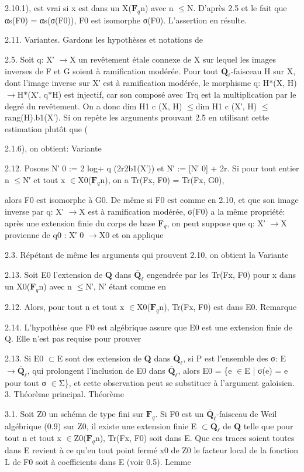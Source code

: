 \documentclass[11pt]{article}
\begin{document}
2.10.1), est vrai si x est dans un X(\(\mathbf F_q\)n) avec n \(\le\)N. D’après 2.5 et le fait que αs(F0) = αs(σ(F0)), F0 est isomorphe σ(F0). L’assertion en résulte. 

2.11. Variantes. Gardons les hypothèses et notations de 

2.5. Soit q: X′ \(\to\)X un revêtement étale connexe de X sur lequel les images inverses de F et G soient à ramification modérée. Pour tout \(\overline{\mathbf Q}_\ell\)-faisceau H sur X, dont l’image inverse sur X′ est à ramification modérée, le morphisme q: H\(*\)(X, H) \(\to\)H\(*\)(X′, q\(*\)H) est injectif, car son composé avec Trq est la multiplication par le degré du revêtement. On a donc dim H1 c (X, H) \(\le\)dim H1 c (X′, H) \(\le\)rang(H).b1(X′). Si on repète les arguments prouvant 2.5 en utilisant cette estimation plutôt que (

2.1.6), on obtient: Variante 

2.12. Posons N′ 0 := 2 log+ q (2r2b1(X′)) et N′ := [N′ 0] + 2r. Si pour tout entier n \(\le\)N′ et tout x \(\in\)X0(\(\mathbf F_q\)n), on a Tr(Fx, F0) = Tr(Fx, G0),

alors F0 est isomorphe à G0. De même si F0 est comme en 2.10, et que son image inverse par q: X′ \(\to\)X est à ramification modérée, σ(F0) a la même propriété: après une extension finie du corps de base \(\mathbf F_q\), on peut suppose que q: X′ \(\to\)X provienne de q0 : X′ 0 \(\to\)X0 et on applique 

2.3. Répétant de même les arguments qui prouvent 2.10, on obtient la Variante 

2.13. Soit E0 l’extension de \(\mathbf Q\) dans \(\overline{\mathbf Q}_\ell\) engendrée par les Tr(Fx, F0) pour x dans un X0(\(\mathbf F_q\)n) avec n \(\le\)N′, N′ étant comme en 

2.12. Alors, pour tout n et tout x \(\in\)X0(\(\mathbf F_q\)n), Tr(Fx, F0) est dans E0. Remarque 

2.14. L’hypothèse que F0 est algébrique assure que E0 est une extension finie de Q. Elle n’est pas requise pour prouver 

2.13. Si E0 \(\subset\)E sont des extension de \(\mathbf Q\) dans \(\overline{\mathbf Q}_\ell\), si P est l’ensemble des σ: E \(\to\)\(\overline{\mathbf Q}_\ell\), qui prolongent l’inclusion de E0 dans \(\overline{\mathbf Q}_\ell\), alors E0 = \{e \(\in\)E | σ(e) = e pour tout σ \(\in\)Σ\}, et cette observation peut se substituer à l’argument galoisien. 3. Théorème principal. Théorème 

3.1. Soit Z0 un schéma de type fini sur \(\mathbf F_q\). Si F0 est un \(\overline{\mathbf Q}_\ell\)-faisceau de Weil algébrique (0.9) sur Z0, il existe une extension finie E \(\subset\)\(\overline{\mathbf Q}_\ell\) de \(\mathbf Q\) telle que pour tout n et tout x \(\in\)Z0(\(\mathbf F_q\)n), Tr(Fx, F0) soit dans E. Que ces traces soient toutes dans E revient à ce qu’en tout point fermé x0 de Z0 le facteur local de la fonction L de F0 soit à coefficients dans E (voir 0.5). Lemme 
\end{document}
